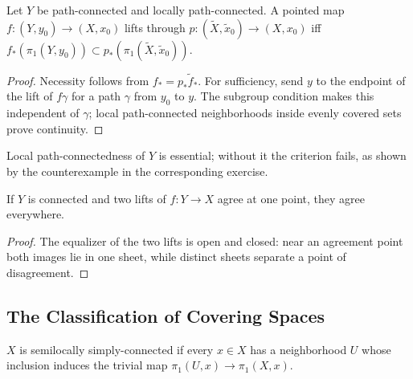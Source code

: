 \begin{proposition}
\label{prop:covering-lifting-criterion}



Let $Y$ be path-connected and locally path-connected. A pointed map
$f:(Y,y_0)\to(X,x_0)$ lifts through
$p:(\widetilde X,\widetilde x_0)\to(X,x_0)$ iff
$f_*(\pi_1(Y,y_0))\subset p_*(\pi_1(\widetilde X,\widetilde x_0))$.
\end{proposition}

\begin{proof}
\sketch Necessity follows from $f_*=p_*\widetilde f_*$. For sufficiency, send
$y$ to the endpoint of the lift of $f\gamma$ for a path $\gamma$ from $y_0$
to $y$. The subgroup condition makes this independent of $\gamma$; local
path-connected neighborhoods inside evenly covered sets prove continuity.
\end{proof}

Local path-connectedness of $Y$ is essential; without it the criterion fails,
as shown by the counterexample in the corresponding exercise.

\begin{proposition}
\label{prop:covering-unique-lifting}



If $Y$ is connected and two lifts of $f:Y\to X$ agree at one point, they agree
everywhere.
\end{proposition}

\begin{proof}
\sketch The equalizer of the two lifts is open and closed: near an agreement
point both images lie in one sheet, while distinct sheets separate a point of
disagreement.
\end{proof}

\subsection*{The Classification of Covering Spaces}

\begin{definition}
\label{def:semilocally-simply-connected}


$X$ is semilocally simply-connected if every $x\in X$ has a neighborhood $U$
whose inclusion induces the trivial map $\pi_1(U,x)\to\pi_1(X,x)$.
\end{definition}

